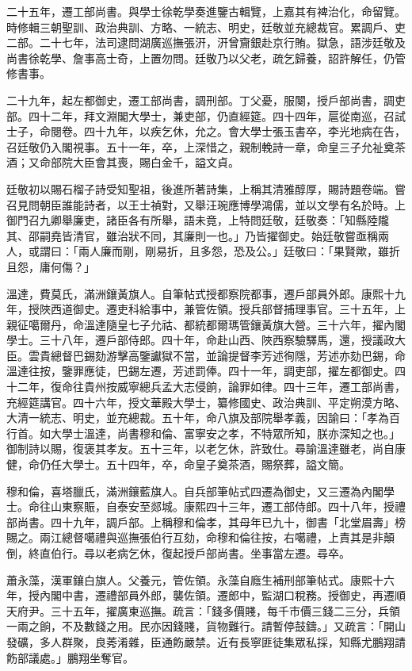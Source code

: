 \begin{pinyinscope}
二十五年，遷工部尚書。與學士徐乾學奏進鑒古輯覽，上嘉其有裨治化，命留覽。時修輯三朝聖訓、政治典訓、方略、一統志、明史，廷敬並充總裁官。累調戶、吏二部。二十七年，法司逮問湖廣巡撫張汧，汧曾齎銀赴京行賄。獄急，語涉廷敬及尚書徐乾學、詹事高士奇，上置勿問。廷敬乃以父老，疏乞歸養，詔許解任，仍管修書事。

二十九年，起左都御史，遷工部尚書，調刑部。丁父憂，服闋，授戶部尚書，調吏部。四十二年，拜文淵閣大學士，兼吏部，仍直經筵。四十四年，扈從南巡，召試士子，命閱卷。四十九年，以疾乞休，允之。會大學士張玉書卒，李光地病在告，召廷敬仍入閣視事。五十一年，卒，上深惜之，親制輓詩一章，命皇三子允祉奠茶酒；又命部院大臣會其喪，賜白金千，謚文貞。

廷敬初以賜石榴子詩受知聖祖，後進所著詩集，上稱其清雅醇厚，賜詩題卷端。嘗召見問朝臣誰能詩者，以王士禎對，又舉汪琬應博學鴻儒，並以文學有名於時。上御門召九卿舉廉吏，諸臣各有所舉，語未竟，上特問廷敬，廷敬奏：「知縣陸隴其、邵嗣堯皆清官，雖治狀不同，其廉則一也。」乃皆擢御史。始廷敬嘗亟稱兩人，或謂曰：「兩人廉而剛，剛易折，且多怨，恐及公。」廷敬曰：「果賢歟，雖折且怨，庸何傷？」

溫達，費莫氏，滿洲鑲黃旗人。自筆帖式授都察院都事，遷戶部員外郎。康熙十九年，授陜西道御史。遷吏科給事中，兼管佐領。授兵部督捕理事官。三十五年，上親征噶爾丹，命溫達隨皇七子允祜、都統都爾瑪管鑲黃旗大營。三十六年，擢內閣學士。三十八年，遷戶部侍郎。四十年，命赴山西、陜西察驗驛馬，還，授議政大臣。雲貴總督巴錫劾游擊高鑒讞獄不當，並論提督李芳述徇隱，芳述亦劾巴錫，命溫達往按，鑒罪應徒，巴錫左遷，芳述罰俸。四十一年，調吏部，擢左都御史。四十二年，復命往貴州按威寧總兵孟大志侵餉，論罪如律。四十三年，遷工部尚書，充經筵講官。四十六年，授文華殿大學士，纂修國史、政治典訓、平定朔漠方略、大清一統志、明史，並充總裁。五十年，命八旗及部院舉孝義，因諭曰：「孝為百行首。如大學士溫達，尚書穆和倫、富寧安之孝，不特眾所知，朕亦深知之也。」御制詩以賜，復褒其孝友。五十三年，以老乞休，許致仕。尋諭溫達雖老，尚自康健，命仍任大學士。五十四年，卒，命皇子奠茶酒，賜祭葬，謚文簡。

穆和倫，喜塔臘氏，滿洲鑲藍旗人。自兵部筆帖式四遷為御史，又三遷為內閣學士。命往山東察賑，自泰安至郯城。康熙四十三年，遷工部侍郎。四十八年，授禮部尚書。四十九年，調戶部。上稱穆和倫孝，其母年已九十，御書「北堂眉壽」榜賜之。兩江總督噶禮與巡撫張伯行互劾，命穆和倫往按，右噶禮，上責其是非顛倒，終直伯行。尋以老病乞休，復起授戶部尚書。坐事當左遷。尋卒。

蕭永藻，漢軍鑲白旗人。父養元，管佐領。永藻自廕生補刑部筆帖式。康熙十六年，授內閣中書，遷禮部員外郎，襲佐領。遷郎中，監湖口稅務。授御史，再遷順天府尹。三十五年，擢廣東巡撫。疏言：「錢多價賤，每千市價三錢二三分，兵領一兩之餉，不及數錢之用。民亦因錢賤，貨物難行。請暫停鼓鑄。」又疏言：「開山發礦，多人群聚，良莠淆雜，臣通飭嚴禁。近有長寧匪徒集眾私採，知縣尤鵬翔請飭部議處。」鵬翔坐奪官。


\end{pinyinscope}
